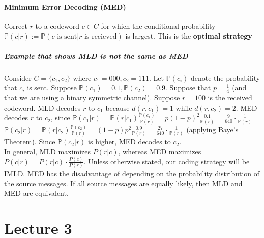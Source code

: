 \documentclass[10pt,letter]{article}
\theoremstyle{plain}
\theoremstyle{definition}
\begin{document}
\paragraph{Minimum Error Decoding (MED)}
Correct $r$ to a codeword $c\in C$ for which the conditional probability $\mathbb{P}(c|r):=\mathbb{P}(c\text{ is sent}|r\text{ is recieved})$ is largest. This is the \textbf{optimal strategy}
\subparagraph{Example that shows MLD is not the same as MED}
Consider $C=\{c_1,c_2\}$ where $c_1=000,c_2=111$. Let $\mathbb{P}(c_i)$ denote the probability that $c_i$ is sent. Suppose $\mathbb{P}(c_1)=0.1,\mathbb{P}(c_2)=0.9$. Suppose that $p=\frac{1}{4}$ (and that we are using a binary symmetric channel). Suppose $r=100$ is the received codeword. MLD decodes $r$ to $c_1$ because $d(r,c_1)=1$ while $d(r,c_2)=2$. MED decodes $r$ to $c_2$, since $\mathbb{P}(c_1|r)=\mathbb{P}(r|c_1)\frac{\mathbb{P}(c_1)}{\mathbb{P}(r)}=p(1-p)^2\frac{0.1}{\mathbb{P}(r)}=\frac{9}{640}\cdot\frac{1}{\mathbb{P}(r)}$ \\$\mathbb{P}(c_2|r)=\mathbb{P}(r|c_2)\frac{\mathbb{P}(c_2)}{\mathbb{P}(r)}=(1-p)p^2\frac{0.9}{\mathbb{P}(r)}=\frac{27}{640}\cdot\frac{1}{\mathbb{P}(r)}$ (applying Baye's Theorem). Since $\mathbb{P}(c_2|r)$ is higher, MED decodes to $c_2$. \\ 
In general, MLD maximizes $P(r|c)$, whereas MED maximizes $P(c|r)=P(r|c)\cdot\frac{P(c)}{P(r)}$. Unless otherwise stated, our coding strategy will be IMLD. MED has the disadvantage of depending on the probability distribution of the source messages. If all source messages are equally likely, then MLD and MED are equivalent. 

\section*{Lecture 3}
\end{document}
